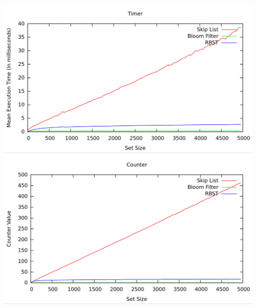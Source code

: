 \documentclass[11pt, notitlepage]{report}
\begin{document}
\includegraphics[width=\linewidth]{img/Timer-Find}
\includegraphics[width=\linewidth]{img/Counter-Find}
\end{document}
